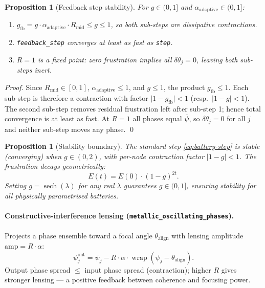 \documentclass[12pt,a4paper]{article}
\theoremstyle{plain}
\newtheorem{proposition}[theorem]{Proposition}
\theoremstyle{definition}
\theoremstyle{remark}
\newcommand{\abs}[1]{\lvert #1 \rvert}
\begin{document}
\begin{proposition}[Feedback step stability]\label{prop:fb-stable}
  For $g \in (0,1]$ and $\alpha_{\mathrm{adaptive}} \in (0,1]$:
  \begin{enumerate}
    \item $g_{\mathrm{fb}} = g\cdot\alpha_{\mathrm{adaptive}}\cdot R_{\mathrm{mid}}
          \le g \le 1$, so both sub-steps are dissipative contractions.
    \item \texttt{feedback\_step} converges at least as fast as \texttt{step}.
    \item $R = 1$ is a fixed point: zero frustration implies all
          $\delta\theta_j = 0$, leaving both sub-steps inert.
  \end{enumerate}
\end{proposition}

\begin{proof}
  Since $R_{\mathrm{mid}}\in[0,1]$, $\alpha_{\mathrm{adaptive}}\le1$, and
  $g\le1$, the product $g_{\mathrm{fb}}\le1$.  Each sub-step is therefore a
  contraction with factor $\abs{1-g_{\mathrm{fb}}}<1$ (resp.\ $\abs{1-g}<1$).
  The second sub-step removes residual frustration left after sub-step 1;
  hence total convergence is at least as fast.  At $R=1$ all phases equal
  $\bar\psi$, so $\delta\theta_j=0$ for all $j$ and neither sub-step moves any
  phase. \qed
\end{proof}

\begin{proposition}[Stability boundary]\label{prop:battery-stable}
  The standard step \eqref{eq:battery-step} is stable (converging) when
  $g \in (0,2)$, with per-node contraction factor $\abs{1-g}<1$.  The
  frustration decays geometrically:
  \begin{equation}
    E(t) = E(0)\cdot(1-g)^{2t}.
    \label{eq:battery-decay}
  \end{equation}
  Setting $g = \operatorname{sech}(\lambda)$ for any real $\lambda$ guarantees
  $g \in (0,1]$, ensuring stability for all physically parametrised batteries.
\end{proposition}

\paragraph{Constructive-interference lensing (\texttt{metallic\_oscillating\_phases}).}
Projects a phase ensemble toward a focal angle $\theta_{\mathrm{align}}$
with lensing amplitude $\mathrm{amp} = R\cdot\alpha$:
\begin{equation}
  \psi_j^{\mathrm{out}}
  = \psi_j - R\cdot\alpha\cdot
    \operatorname{wrap}(\psi_j - \theta_{\mathrm{align}}).
  \label{eq:lensing}
\end{equation}
Output phase spread $\le$ input phase spread (contraction); higher $R$ gives
stronger lensing — a positive feedback between coherence and focusing power.
\end{document}
